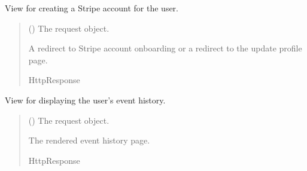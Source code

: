 \documentclass[letterpaper,10pt,english]{sphinxmanual}
\begin{document}

\begin{fulllineitems}
\label{\detokenize{modules/views:account.views.create_stripe_account}}
\pysigstartsignatures
{}
\pysigstopsignatures
\sphinxAtStartPar
View for creating a Stripe account for the user.
\begin{quote}\begin{description}
\sphinxAtStartPar
{} () \textendash{} The request object.

\sphinxAtStartPar
A redirect to Stripe account onboarding or a redirect to the update profile page.

\sphinxAtStartPar
HttpResponse

\end{description}\end{quote}

\end{fulllineitems}


\begin{fulllineitems}
\label{\detokenize{modules/views:account.views.event_history}}
\pysigstartsignatures
{}
\pysigstopsignatures
\sphinxAtStartPar
View for displaying the user’s event history.
\begin{quote}\begin{description}
\sphinxAtStartPar
{} () \textendash{} The request object.

\sphinxAtStartPar
The rendered event history page.

\sphinxAtStartPar
HttpResponse

\end{description}\end{quote}

\end{fulllineitems}
\end{document}
